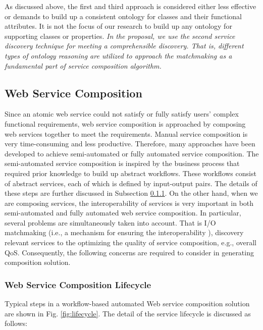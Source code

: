 As discussed above, the first and third approach is considered either less effective or demands to build up a consistent ontology for classes and their functional attributes. It is not the focus of our research to build up any ontology for supporting classes or properties.  \emph{In the proposal, we use the second service discovery technique for meeting a comprehensible discovery. That is, different types of ontology reasoning are utilized to approach the matchmaking as a fundamental part of service composition algorithm.}



\subsection{Web Service Composition}\label{servicecomposition}

Since an atomic web service could not satisfy or fully satisfy users' complex functional requirements, web service composition is approached by composing web services together to meet the requirements. Manual service composition is very time-consuming and less productive. Therefore, many approaches have been developed to achieve semi-automated or fully automated service composition. The semi-automated service composition is inspired by the business process that required prior knowledge to build up abstract workflows. These workflows consist of abstract services, each of which is defined by input-output pairs. The details of these steps are further discussed in Subsection \ref{lifecycle}. On the other hand, when we are composing services, the interoperability of services is very important in both semi-automated and fully automated web service composition. In particular, several problems are simultaneously taken into account. That is I/O matchmaking (i.e., a mechanism for ensuring the interoperability ), discovery relevant services to the optimizing the quality of service composition, e.g., overall QoS. Consequently, the following concerns are required to consider in generating composition solution. 


\subsubsection{Web Service Composition Lifecycle}\label{lifecycle}
Typical steps in a workflow-based automated Web service composition solution are shown in Fig. \ref{fig:lifecycle}. The detail of the service lifecycle is discussed as follows:


